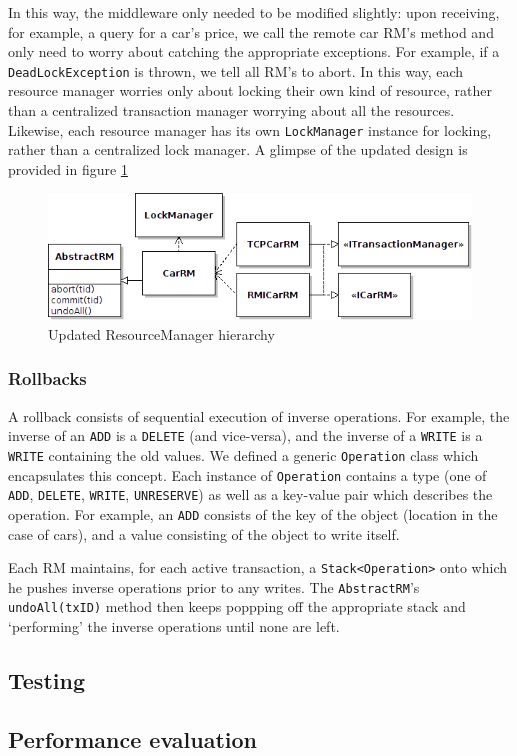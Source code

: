 \documentclass[a4paper]{article}
\begin{document}
In this way, the middleware only needed to be modified slightly: upon receiving, for example, a query for a car's price, we call the remote car RM's method and only need to worry about catching the appropriate exceptions. For example, if a 
\texttt{DeadLockException} is thrown, we tell all RM's to abort. In this way, each resource manager worries only about locking their own kind of resource, rather than a centralized transaction manager worrying about all the resources.
Likewise, each resource manager has its own \texttt{LockManager} instance for locking, rather than a centralized lock manager. A glimpse of the updated design is provided in figure \ref{txncarrm}
\begin{figure}[h!]
  \centering
	\includegraphics[scale=0.6]{txncarrm.png}
  \caption{Updated ResourceManager hierarchy}
  \label{txncarrm}
\end{figure}
\subsubsection{Rollbacks}
\label{rollbacks}

A rollback consists of sequential execution of inverse operations. For example, the inverse of an \texttt{ADD} is a \texttt{DELETE} (and vice-versa), and the inverse of a \texttt{WRITE} is a \texttt{WRITE} containing the old values. 
We defined a generic \texttt{Operation} class which encapsulates this concept. Each instance of \texttt{Operation} contains a type (one of \texttt{ADD}, \texttt{DELETE}, \texttt{WRITE}, \texttt{UNRESERVE}) as well as a key-value pair
which describes the operation. For example, an \texttt{ADD} consists of the key of the object (location in the case of cars), and a value consisting of the object to write itself. 

Each RM maintains, for each active transaction, a \texttt{Stack<Operation>} onto which he pushes inverse operations prior to any writes. The \texttt{AbstractRM}'s \texttt{undoAll(txID)} method then keeps poppping off the appropriate stack
and `performing' the inverse operations until none are left. 

\subsection{Testing}
\subsection{Performance evaluation}

%
%
\end{document}
